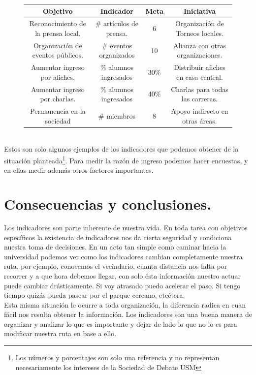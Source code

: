 \documentclass[spanish, fleqn]{article}
\begin{document}
	\begin{figure}[!htbp]
	\begin{tabular}{|c|c|c|c|}
		\hline
		\textbf{Objetivo} & \textbf{Indicador} & \textbf{Meta} & \textbf{Iniciativa} \\
		\hline
		Reconocimiento de la prensa local. & \# artículos de prensa. & 6 & 
			Organización de Torneos locales.\\
		\hline
		Organización de eventos públicos. &\# eventos organizados & 10 & 
			Alianza con otras organizaciones. \\
		\hline
		Aumentar ingreso por afiches. &\% alumnos ingresados & 30\% &
			Distribuir afiches en casa central.\\
		\hline
		Aumentar ingreso por charlas. &\% alumnos ingresados & 40\% &
			Charlas para todas las carreras.\\
		\hline
		Permanencia en la sociedad &\# miembros  & 8 & 
			Apoyo indirecto en otras áreas.\\
		\hline
	\end{tabular}
	\end{figure}\\
	Estos son solo algunos ejemplos de los indicadores que podemos obtener de la
	situación planteada\footnote{Los números y porcentajes son solo una referencia
	y no representan necesariamente los intereses de la Sociedad de Debate USM}.
	Para medir la razón de ingreso podemos hacer encuestas, y en ellas medir
	además otros factores importantes.

	\section{Consecuencias y conclusiones.}
	Los indicadores son parte inherente de nuestra vida. En toda tarea con objetivos
	específicos la existencia de indicadores nos da cierta seguridad y condiciona
	nuestra toma de decisiones. En un acto tan simple como caminar hacia la universidad
	podemos ver como los indicadores cambian completamente nuestra ruta, por
	ejemplo, conocemos el vecindario, cuanta distancia nos falta por recorrer y
	a que hora debemos llegar, con solo ésta información nuestro actuar puede
	cambiar drásticamente. Si voy atrasado puedo acelerar el paso. Si tengo
	tiempo quizás pueda pasear por el parque cercano, etcétera.\\
	Esta misma situación le ocurre a toda organización, la diferencia radica en
	cuan fácil nos resulta obtener la información. Los indicadores son una buena
	manera de organizar y analizar lo que es importante y dejar de lado lo que no
	lo es para modificar nuestra ruta en base a ello.
\end{document}
